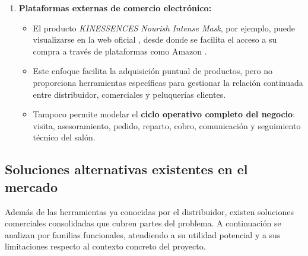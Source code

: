 \begin{enumerate}[label=\textbf{\arabic*.}, leftmargin=1.1cm, itemsep=0.45em, topsep=0.25em]
  \item \textbf{Plataformas externas de comercio electrónico:}
  \begin{itemize}[topsep=0.1em, itemsep=0.15em]
    \item El producto \textit{KINESSENCES Nourish Intense Mask}, por ejemplo, puede visualizarse en la web oficial \citep{kincosmetics_producto}, desde donde se facilita el acceso a su compra a través de plataformas como Amazon \citep{amazon_producto}.
    \item Este enfoque facilita la adquisición puntual de productos, pero no proporciona herramientas específicas para gestionar la relación continuada entre distribuidor, comerciales y peluquerías clientes.
    \item Tampoco permite modelar el \textbf{ciclo operativo completo del negocio}: visita, asesoramiento, pedido, reparto, cobro, comunicación y seguimiento técnico del salón.
  \end{itemize}
\end{enumerate}

\subsection{Soluciones alternativas existentes en el mercado}

Además de las herramientas ya conocidas por el distribuidor, existen soluciones comerciales consolidadas que cubren partes del problema. A continuación se analizan por familias funcionales, atendiendo a su utilidad potencial y a sus limitaciones respecto al contexto concreto del proyecto.


